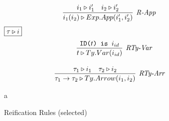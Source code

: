 \begin{figure}[t]
\begin{minipage}[t]{.44\textwidth}
\[\begin{array}{c}
\infer[\textit{R-App}]
	{ i_1(i_2)  \triangleright Exp.App(i'_1,i'_2) }
	{ i_1 \triangleright i'_1  & i_2 \triangleright i'_2   }
\end{array}
\]
$\fbox{$\tau \triangleright i$}$
\vspace{-20px}
\[
\begin{array}{c}
~~~~\infer[\textit{RTy-Var}]
	{ t \triangleright Ty.Var(i_{id})   }
	{ \texttt{ID($t$) is $i_{id}$}} \\[3ex]

\infer[\textit{RTy-Arr}]
	{ \tau_1 \rightarrow \tau_2 \triangleright Ty.Arrow(i_1,i_2 )  }
	{ \tau_1 \triangleright i_1 & \tau_2 \triangleright i_2 }
\end{array}
\vspace{-15px}
\]
\label{fig:reification}
\caption{Reification Rules (selected)}
\end{minipage}
\begin{minipage}[t]{.44\textwidth}
a
\end{minipage}
\end{figure}

